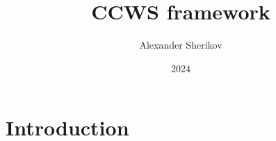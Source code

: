 \documentclass[hyperref={colorlinks=false, breaklinks=true},11pt]{beamer}
\title{CCWS framework}
\author{Alexander Sherikov}
\date{2024}
\begin{document}
\begin{frame}
    \titlepage
\end{frame}



\section{Introduction}
\end{document}

